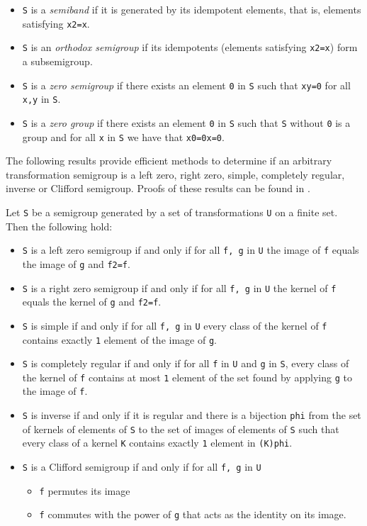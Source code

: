 \documentclass[a4paper,11pt]{report}
\begin{document}
{{\begin{itemize}
\item  \texttt{S} is a \emph{semiband} if it is generated by its idempotent elements, that is, elements satisfying \texttt{x\texttt{}2=x}.
\item  \texttt{S} is an \emph{orthodox semigroup} if its idempotents (elements satisfying \texttt{x\texttt{}2=x}) form a subsemigroup.
\item \texttt{S} is a \emph{zero semigroup} if there exists an element \texttt{0} in \texttt{S} such that \texttt{xy=0} for all \texttt{x,y} in \texttt{S}.
\item \texttt{S} is a \emph{zero group} if there exists an element \texttt{0} in \texttt{S} such that \texttt{S} without \texttt{0} is a group and for all \texttt{x} in \texttt{S} we have that \texttt{x0=0x=0}.
\end{itemize}
 The following results provide efficient methods to determine if an arbitrary
transformation semigroup is a left zero, right zero, simple, completely
regular, inverse or Clifford semigroup. Proofs of these results can be found
in \cite{largest}.

 Let \texttt{S} be a semigroup generated by a set of transformations \texttt{U} on a finite set. Then the following hold: 
\begin{itemize}
\item  \texttt{S} is a left zero semigroup if and only if for all \texttt{f, g} in \texttt{U} the image of \texttt{f} equals the image of \texttt{g} and \texttt{f\texttt{}2=f}.
\item  \texttt{S} is a right zero semigroup if and only if for all \texttt{f, g} in \texttt{U} the kernel of \texttt{f} equals the kernel of \texttt{g} and \texttt{f\texttt{}2=f}.
\item  \texttt{S} is simple if and only if for all \texttt{f, g} in \texttt{U} every class of the kernel of \texttt{f} contains exactly \texttt{1} element of the image of \texttt{g}.
\item  \texttt{S} is completely regular if and only if for all \texttt{f} in \texttt{U} and \texttt{g} in \texttt{S}, every class of the kernel of \texttt{f} contains at most \texttt{1} element of the set found by applying \texttt{g} to the image of \texttt{f}.
\item  \texttt{S} is inverse if and only if it is regular and there is a bijection \texttt{\texttt{}phi} from the set of kernels of elements of \texttt{S} to the set of images of elements of \texttt{S} such that every class of a kernel \texttt{K} contains exactly \texttt{1} element in \texttt{(K)\texttt{}phi}.
\item  \texttt{S} is a Clifford semigroup if and only if for all \texttt{f, g} in \texttt{U} 
\begin{itemize}
\item  \texttt{f} permutes its image
\item  \texttt{f} commutes with the power of \texttt{g} that acts as the identity on its image.
\end{itemize}


\end{itemize}}}
\end{document}
